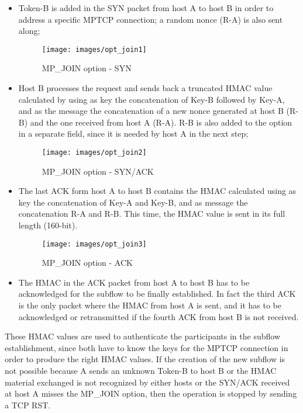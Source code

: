 \begin{itemize}
  \item Token-B is added in the SYN packet from host A to host B in order to address a specific MPTCP connection; a random nonce (R-A) is also sent along;
  
\begin{figure}[!htb]
\centering
\texttt{[image: images/opt\_join1]}
\caption{MP\_JOIN option - SYN}
\label{fig:opt_join1}
\end{figure}

  \item Host B processes the request and sends back a truncated HMAC value calculated by using as key the concatenation of Key-B followed by Key-A, and as the message the concatenation of a new nonce generated at host B (R-B) and the one received from host A (R-A). R-B is also added to the option in a separate field, since it is needed by host A in the next step;
  
\begin{figure}[!htb]
\centering
\texttt{[image: images/opt\_join2]}
\caption{MP\_JOIN option - SYN/ACK}
\label{fig:opt_join2}
\end{figure}

  \item The last ACK form host A to host B contains the HMAC calculated using as key the concatenation of Key-A and Key-B, and as message the concatenation R-A and R-B. This time, the HMAC value is sent in its full length (160-bit).
\begin{figure}[!htb]
\centering
\texttt{[image: images/opt\_join3]}
\caption{MP\_JOIN option - ACK}
\label{fig:opt_join3}
\end{figure}
  \item The HMAC in the ACK packet from host A to host B has to be acknowledged for the subflow to be finally established. In fact the third ACK is the only packet where the HMAC from host A is sent, and it has to be acknowledged or retransmitted if the fourth ACK from host B is not received.
\end{itemize}

These HMAC values are used to authenticate the participants in the subflow establishment, since both have to know the keys for the MPTCP connection in order to produce the right HMAC values. If the creation of the new subflow is not possible because A sends an unknown Token-B to host B or the HMAC material exchanged is not recognized by either hosts or the SYN/ACK received at host A misses the MP\_JOIN option, then the operation is stopped by sending a TCP RST.

